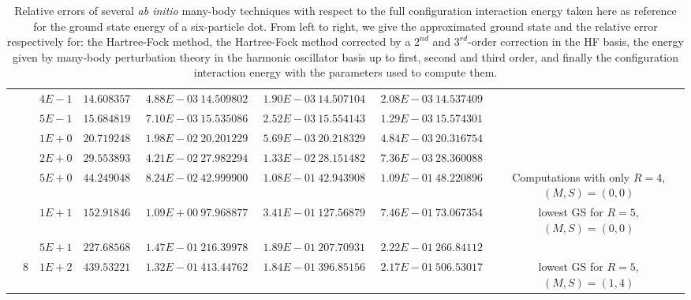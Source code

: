 \begin{landscape}
\begin{table}[ht]
{\begin{tabular}[c]{c|c|c|c|c|c|c|c|c|c|c}
& &$4E-1$ & $14.608357065775$ & $4.88E-03$ & $14.509802433838$ & $1.90E-03$ & $14.507104502585$ & $2.08E-03$ & $14.537409076271$ &  \\
& &$5E-1$ & $15.684819018465$ & $7.10E-03$ & $15.535086837586$ & $2.52E-03$ & $15.554143298097$ & $1.29E-03$ & $15.574301411949$ &  \\
& &$1E+0$ & $20.719248175282$ & $1.98E-02$ & $20.201229121983$ & $5.69E-03$ & $20.218329788077$ & $4.84E-03$ & $20.316754002510$ &  \\
& &$2E+0$ & $29.553893712856$ & $4.21E-02$ & $27.982294512087$ & $1.33E-02$ & $28.151482969245$ & $7.36E-03$ & $28.360088424685$ &  \\
& &$5E+0$ & $44.249048160124$ & $8.24E-02$ & $42.999900804541$ & $1.08E-01$ & $42.943908735317$ & $1.09E-01$ & $48.220896992378$ & \multirow{-20}{3cm}{Computations with only $R=4$, $(M,S)=(0,0)$}  \\ \cline{10-11}
& &$1E+1$ & $152.918469535500$ & $1.09E+00$ & $97.968877514451$ & $3.41E-01$ & $127.568792185046$ & $7.46E-01$ & $73.067354457427$ & lowest GS for $R=5$, $(M,S)=(0,0)$\\ \cline{10-11}
& &$5E+1$ & $227.685682577638$ & $1.47E-01$ & $216.399780989799$ & $1.89E-01$ & $207.709314596807$ & $2.22E-01$ & $266.841126091951$ &  \\
& \multirow{-23}{*}{8} &$1E+2$ & $439.532217979911$ & $1.32E-01$ & $413.447621224150$ & $1.84E-01$ & $396.851566567381$ & $2.17E-01$ & $506.530170970484$ & \multirow{-2}{3cm}{lowest GS for $R=5$, $(M,S)=(1,4)$}\\
\toprule[1pt]
\end{tabular}
}
 \caption{Relative errors of several \textit{ab initio} many-body techniques with respect to the full configuration interaction energy taken here as reference for the ground state energy of a six-particle dot. From left to right, we give the approximated ground state and the relative error respectively for: the Hartree-Fock method, the Hartree-Fock method corrected by a $2^{nd}$ and $3^{rd}$-order correction in the HF basis, the energy given by many-body perturbation theory in the harmonic oscillator basis up to first, second and third order, and finally the configuration interaction energy with the parameters used to compute them.}
\label{tab:comparisonMethods06eHF} 
\end{table} 
\end{landscape}



